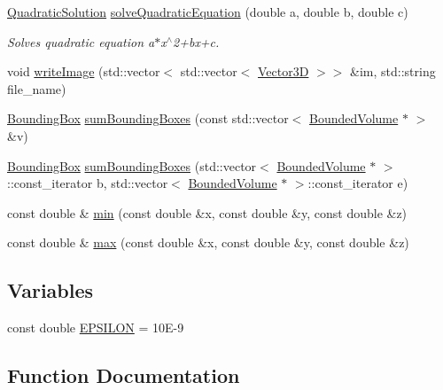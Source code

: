 \begin{DoxyCompactItemize}
\item 
\mbox{\hyperlink{structutility_1_1QuadraticSolution}{Quadratic\+Solution}} \mbox{\hyperlink{namespaceutility_a8b46b751269001ecbf33625ccdacfdfa}{solve\+Quadratic\+Equation}} (double a, double b, double c)
\begin{DoxyCompactList}\small\item\em Solves quadratic equation a$\ast$x$^\wedge$2+bx+c. \end{DoxyCompactList}\item 
void \mbox{\hyperlink{namespaceutility_a34be8140338c47d4f6547c1093a0d772}{write\+Image}} (std\+::vector$<$ std\+::vector$<$ \mbox{\hyperlink{classVector3D}{Vector3D}} $>$$>$ \&im, std\+::string file\+\_\+name)
\item 
\mbox{\hyperlink{classBoundingBox}{Bounding\+Box}} \mbox{\hyperlink{namespaceutility_ab2fd278d0cec1254250c5dc3dc3edc64}{sum\+Bounding\+Boxes}} (const std\+::vector$<$ \mbox{\hyperlink{classBoundedVolume}{Bounded\+Volume}} $\ast$ $>$ \&v)
\item 
\mbox{\hyperlink{classBoundingBox}{Bounding\+Box}} \mbox{\hyperlink{namespaceutility_a97d2cabbc342d0ed91c63fedd698a1af}{sum\+Bounding\+Boxes}} (std\+::vector$<$ \mbox{\hyperlink{classBoundedVolume}{Bounded\+Volume}} $\ast$ $>$\+::const\+\_\+iterator b, std\+::vector$<$ \mbox{\hyperlink{classBoundedVolume}{Bounded\+Volume}} $\ast$ $>$\+::const\+\_\+iterator e)
\item 
const double \& \mbox{\hyperlink{namespaceutility_a54a16aa114a439cc9b6bbf37853fbedb}{min}} (const double \&x, const double \&y, const double \&z)
\item 
const double \& \mbox{\hyperlink{namespaceutility_adb70851ce3cf7edecde8490bd7f5c314}{max}} (const double \&x, const double \&y, const double \&z)
\end{DoxyCompactItemize}
\subsection*{Variables}
\begin{DoxyCompactItemize}
\item 
const double \mbox{\hyperlink{namespaceutility_a5726adf0a326e6887e05b0f485e14fde}{E\+P\+S\+I\+L\+ON}} = 10\+E-\/9
\end{DoxyCompactItemize}


\subsection{Function Documentation}
\mbox{\label{namespaceutility_a48a4f01e19bee62fd4f16da19255abeb}} 
